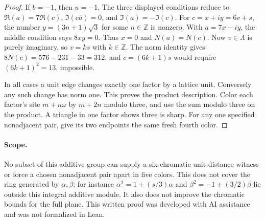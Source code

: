 \documentclass[11pt,letterpaper]{article}
\begin{document}
\begin{proof}
If \(b=-1\), then \(u=-1\). The three displayed conditions
reduce to \(\Re(a)=7\Re(c)\), \(\Im(c\overline a)=0\),
and \(\Im(a)=-\Im(c)\). For \(c=x+iy=6v+s\), the number
\(y=(3n+1)\sqrt3\) for some \(n\in\mathbb Z\) is nonzero.
With \(a=7x-iy\), the middle condition says \(8xy=0\).
Thus \(x=0\) and \(N(a)=N(c)\). Now \(v\in\Lambda\) is
purely imaginary, so \(v=ks\) with \(k\in\mathbb Z\).
The norm identity gives \(8N(c)=576-231-33=312\), and
\(c=(6k+1)s\) would require \((6k+1)^2=13\), impossible.

In all cases a unit edge changes exactly one factor by a
lattice unit. Conversely any such change has norm one. This
proves the product description. Color each factor's site
\(m+n\omega\) by \(m+2n\) modulo three, and use the sum
modulo three on the product. A triangle in one factor shows
three is sharp. For any one specified nonadjacent pair, give
its two endpoints the same fresh fourth color.
\end{proof}

\paragraph{Scope.}
No subset of this additive group can supply a six-chromatic
unit-distance witness or force a chosen nonadjacent pair apart
in five colors. This does not cover the ring generated by
\(\alpha,\beta\); for instance
\(\alpha^2=1+(s/3)\alpha\) and
\(\beta^2=-1+(3/2)\beta\) lie outside this integral additive
module. It also does not improve the chromatic bounds for the
full plane. This written proof was developed with AI assistance
and was not formalized in Lean.
\end{document}
